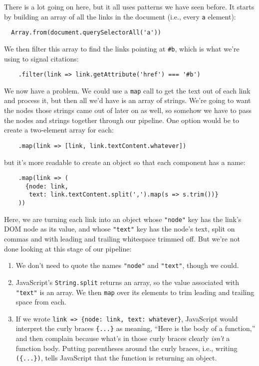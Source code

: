 There is a lot going on here,
but it all uses patterns we have seen before.
It starts by building an array of all the links in the document
(i.e., every \texttt{a} element):

\begin{verbatim}
  Array.from(document.querySelectorAll('a'))
\end{verbatim}

We then filter this array to find the links pointing at \texttt{\#b},
which is what we're using to signal citations:

\begin{verbatim}
    .filter(link => link.getAttribute('href') === '#b')
\end{verbatim}

We now have a problem.
We could use a \texttt{map} call to get the text out of each link and process it,
but then all we'd have is an array of strings.
We're going to want the nodes those strings came out of later on as well,
so somehow we have to pass the nodes and strings together through our pipeline.
One option would be to create a two-element array for each:

\begin{verbatim}
    .map(link => [link, link.textContent.whatever])
\end{verbatim}

\noindent
but it's more readable to create an object so that each component has a name:

\begin{verbatim}
    .map(link => (
      {node: link,
       text: link.textContent.split(',').map(s => s.trim())}
    ))
\end{verbatim}

Here,
we are turning each link into an object whose \texttt{"node"} key has the link's DOM node as its value,
and whose \texttt{"text"} key has the node's text,
split on commas and with leading and trailing whitespace trimmed off.
But we're not done looking at this stage of our pipeline:

\begin{enumerate}
\item
  We don't need to quote the names \texttt{"node"} and \texttt{"text"}, though we could.
\item
  JavaScript's \texttt{String.split} returns an array,
  so the value associated with \texttt{"text"} is an array.
  We then \texttt{map} over its elements to trim leading and trailing space from each.
\item
  If we wrote \texttt{link\ ={\textgreater}\ \{node:\ link,\ text:\ whatever\}},
  JavaScript would interpret the curly braces \texttt{\{...\}} as meaning,
  ``Here is the body of a function,''
  and then complain because what's in those curly braces clearly \emph{isn't} a function body.
  Putting parentheses around the curly braces,
  i.e., writing \texttt{(\{...\})},
  tells JavaScript that the function is returning an object.
\end{enumerate}

